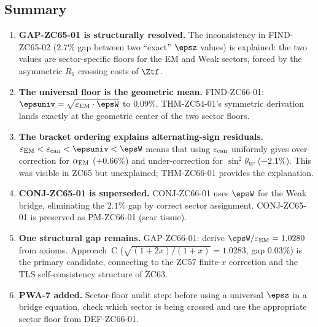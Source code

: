 \documentclass[12pt, a4paper]{article}
\renewcommand{\epsEM}{\varepsilon_{\rm EM}}
\renewcommand{\epscan}{\varepsilon_{\rm can}}
\renewcommand{\swsq}{\sin^2\!\theta_W}
\renewcommand{\aEM}{\alpha_{\rm EM}}
\begin{document}
\subsection{Summary}
\label{sec:summary}

\begin{enumerate}[leftmargin=*]

\item \textbf{GAP-ZC65-01 is structurally resolved.}
The inconsistency in FIND-ZC65-02 ($2.7\%$ gap between
two ``exact'' $\epsz$ values) is explained: the two values
are sector-specific floors for the EM and Weak sectors,
forced by the asymmetric $R_1$ crossing costs of $\Ztf$.

\item \textbf{The universal floor is the geometric mean.}
FIND-ZC66-01: $\epsuniv = \sqrt{\epsEM\cdot\epsW}$ to $0.09\%$.
THM-ZC54-01's symmetric derivation lands exactly at the
geometric center of the two sector floors.

\item \textbf{The bracket ordering explains alternating-sign residuals.}
$\epsEM < \epscan < \epsuniv < \epsW$
means that using $\epscan$ uniformly gives
over-correction for $\aEM$ ($+0.66\%$) and
under-correction for $\swsq$ ($-2.1\%$).
This was visible in ZC65 but unexplained; THM-ZC66-01
provides the explanation.

\item \textbf{CONJ-ZC65-01 is superseded.}
CONJ-ZC66-01 uses $\epsW$ for the Weak bridge, eliminating
the $2.1\%$ gap by correct sector assignment.
CONJ-ZC65-01 is preserved as PM-ZC66-01 (scar tissue).

\item \textbf{One structural gap remains.}
GAP-ZC66-01: derive $\epsW/\epsEM = 1.0280$ from axioms.
Approach~C ($\sqrt{(1+2x)/(1+x)} = 1.0283$, gap $0.03\%$)
is the primary candidate, connecting to the ZC57 finite-$x$
correction and the TLS self-consistency structure of ZC63.

\item \textbf{PWA-7 added.}
Sector-floor audit step: before using a universal $\epsz$
in a bridge equation, check which sector is being crossed
and use the appropriate sector floor from DEF-ZC66-01.

\end{enumerate}
\end{document}
